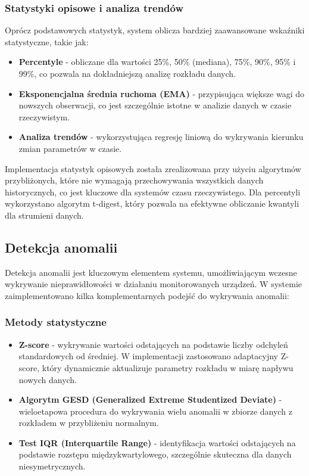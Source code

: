 \subsubsection{Statystyki opisowe i analiza trendów}
\label{subsubsec:statystyki_opisowe}

Oprócz podstawowych statystyk, system oblicza bardziej zaawansowane wskaźniki statystyczne, takie jak:

\begin{itemize}
    \item \textbf{Percentyle} - obliczane dla wartości 25\%, 50\% (mediana), 75\%, 90\%, 95\% i 99\%, co pozwala na dokładniejszą analizę rozkładu danych.
    \item \textbf{Eksponencjalna średnia ruchoma (EMA)} - przypisująca większe wagi do nowszych obserwacji, co jest szczególnie istotne w analizie danych w czasie rzeczywistym.
    \item \textbf{Analiza trendów} - wykorzystująca regresję liniową do wykrywania kierunku zmian parametrów w czasie.
\end{itemize}

Implementacja statystyk opisowych została zrealizowana przy użyciu algorytmów przybliżonych, które nie wymagają przechowywania wszystkich danych historycznych, co jest kluczowe dla systemów czasu rzeczywistego. Dla percentyli wykorzystano algorytm t-digest, który pozwala na efektywne obliczanie kwantyli dla strumieni danych.

\subsection{Detekcja anomalii}
\label{subsec:detekcja_anomalii}

Detekcja anomalii jest kluczowym elementem systemu, umożliwiającym wczesne wykrywanie nieprawidłowości w działaniu monitorowanych urządzeń. W systemie zaimplementowano kilka komplementarnych podejść do wykrywania anomalii:

\subsubsection{Metody statystyczne}
\label{subsubsec:metody_statystyczne}

\begin{itemize}
    \item \textbf{Z-score} - wykrywanie wartości odstających na podstawie liczby odchyleń standardowych od średniej. W implementacji zastosowano adaptacyjny Z-score, który dynamicznie aktualizuje parametry rozkładu w miarę napływu nowych danych.
    \item \textbf{Algorytm GESD (Generalized Extreme Studentized Deviate)} - wieloetapowa procedura do wykrywania wielu anomalii w zbiorze danych z rozkładem w przybliżeniu normalnym.
    \item \textbf{Test IQR (Interquartile Range)} - identyfikacja wartości odstających na podstawie rozstępu międzykwartylowego, szczególnie skuteczna dla danych niesymetrycznych.
\end{itemize}

